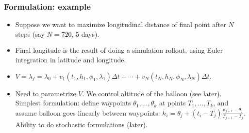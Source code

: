 \documentclass[10pt,mathserif]{beamer}
\begin{document}
\begin{frame}
\frametitle{Formulation: example}
\begin{itemize}
\item Suppose we want to maximize longitudinal distance of final point after $N$ steps (say $N=720$, 5 days).
\item Final longitude is the result of doing a simulation rollout, using Euler integration in latitude and longitude.
\item $V = \lambda_f=\lambda_0 + v_1(t_1, h_1,\phi_1,\lambda_1)\Delta t + \cdots + v_N(t_N, h_N, \phi_N,\lambda_N)\Delta t$.


\item Need to parametrize $V$. We control altitude of the balloon (see later). Simplest formulation: define waypoints $\theta_1,\dots,\theta_k$ at points $T_1,\dots,T_k$, and assume balloon goes linearly between waypoints: $h_i=\theta_j + (t_i-T_j)\frac{\theta_{j+1}-\theta_j}{T_{j+1}-T_j}$. Ability to do stochastic formulations (later).
\end{itemize}
\end{frame}
\end{document}
